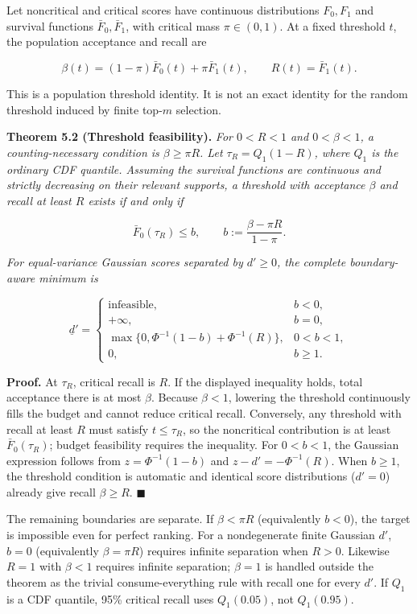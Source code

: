 \documentclass[
  11pt]{article}
\begin{document}
Let noncritical and critical scores have continuous distributions
\(F_0,F_1\) and survival functions \(\bar F_0,\bar F_1\), with critical
mass \(\pi\in(0,1)\). At a fixed threshold \(t\), the population
acceptance and recall are

\[\beta(t)=(1-\pi)\bar F_0(t)+\pi\bar F_1(t),\qquad R(t)=\bar F_1(t).\]

This is a population threshold identity. It is not an exact identity for
the random threshold induced by finite top-\(m\) selection.

\textbf{Theorem 5.2 (Threshold feasibility).} \emph{For \(0<R<1\) and
\(0<\beta<1\), a counting-necessary condition is \(\beta\ge\pi R\). Let
\(\tau_R=Q_1(1-R)\), where \(Q_1\) is the ordinary CDF quantile.
Assuming the survival functions are continuous and strictly decreasing
on their relevant supports, a threshold with acceptance \(\beta\) and
recall at least \(R\) exists if and only if}

\[\bar F_0(\tau_R)\le b,\qquad b:=\frac{\beta-\pi R}{1-\pi}.\]

\emph{For equal-variance Gaussian scores separated by \(d'\ge0\), the
complete boundary-aware minimum is}

\[\underline d'=\begin{cases}
\text{infeasible},&b<0,\\
+\infty,&b=0,\\
\max\{0,\Phi^{-1}(1-b)+\Phi^{-1}(R)\},&0<b<1,\\
0,&b\ge1.
\end{cases}\]

\textbf{Proof.} At \(\tau_R\), critical recall is \(R\). If the
displayed inequality holds, total acceptance there is at most \(\beta\).
Because \(\beta<1\), lowering the threshold continuously fills the
budget and cannot reduce critical recall. Conversely, any threshold with
recall at least \(R\) must satisfy \(t\le\tau_R\), so the noncritical
contribution is at least \(\bar F_0(\tau_R)\); budget feasibility
requires the inequality. For \(0<b<1\), the Gaussian expression follows
from \(z=\Phi^{-1}(1-b)\) and \(z-d'=-\Phi^{-1}(R)\). When \(b\ge1\),
the threshold condition is automatic and identical score distributions
(\(d'=0\)) already give recall \(\beta\ge R\). \(\blacksquare\)

The remaining boundaries are separate. If \(\beta<\pi R\) (equivalently
\(b<0\)), the target is impossible even for perfect ranking. For a
nondegenerate finite Gaussian \(d'\), \(b=0\) (equivalently
\(\beta=\pi R\)) requires infinite separation when \(R>0\). Likewise
\(R=1\) with \(\beta<1\) requires infinite separation; \(\beta=1\) is
handled outside the theorem as the trivial consume-everything rule with
recall one for every \(d'\). If \(Q_1\) is a CDF quantile, 95\% critical
recall uses \(Q_1(0.05)\), not \(Q_1(0.95)\).
\end{document}
